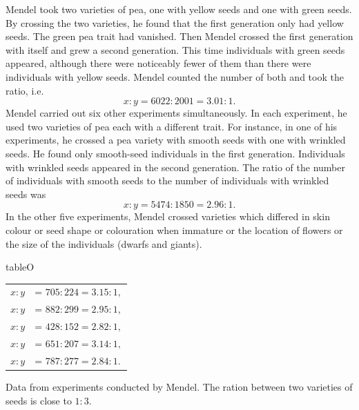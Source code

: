 Mendel took two varieties of pea, one with yellow seeds and one with
green seeds. By crossing the two varieties, he found that the first
generation only had yellow seeds. The green pea trait had vanished.
Then Mendel crossed the first generation with itself and grew a second
generation. This time individuals with green seeds appeared, although
there were noticeably fewer of them than there were individuals with
yellow seeds. Mendel counted the number of both and took the ratio,
i.e.
\begin{equation*}%
x:y = 6022:2001 = 3.01:1.
\end{equation*}
Mendel carried out six other experiments simultaneously. In each
experiment, he used two varieties of pea each with a different trait. For
instance, in one of his experiments, he crossed a pea variety with smooth
seeds with one with wrinkled seeds. He found only smooth-seed
individuals in the first generation. Individuals with wrinkled seeds
appeared in the second generation. The ratio of the number of
individuals with smooth seeds to the number of individuals with
wrinkled seeds was
\begin{equation*}%
x:y = 5474:1850 = 2.96:1.
\end{equation*}
In the other five experiments, Mendel crossed varieties which differed
in skin colour or seed shape or colouration when immature or the
location of flowers or the size of the individuals (dwarfs and giants).

\begin{wrapfloat}{table}{O}{\mfwidth}
\begin{tabular}{ll}%
$x:y$ & = $705:224  = 3.15:1,$ \\
$x:y$ & = $882:299  = 2.95:1,$ \\
$x:y$ & = $428:152  = 2.82:1,$ \\
$x:y$ & = $651:207 = 3.14:1,$ \\
$x:y$ & = $787:277  = 2.84:1.$
\end{tabular}
\caption{Data from experiments conducted by Mendel. The ration between two varieties of seeds is close to $1:3$.\label{mendel-result}}
\end{wrapfloat}



